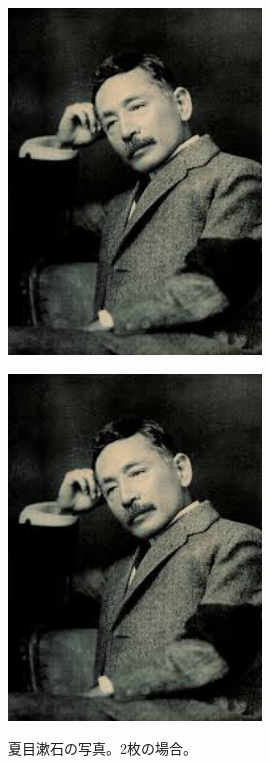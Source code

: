\documentclass[uplatex]{jsarticle}
\begin{document}
\begin{figure}[H]
	\centering
	\begin{minipage}[b]{0.49\linewidth}
		\centering
		\includegraphics[width=0.6\textwidth]{figure/natsume_soseki.jpeg}
		\label{fig:first}
	\end{minipage}
	\begin{minipage}[b]{0.49\linewidth}
		\centering
		\includegraphics[width=0.6\textwidth]{figure/natsume_soseki.jpeg}
		\label{fig:second}
	\end{minipage}
	\caption{夏目漱石の写真\cite{Soseki1905}。2枚の場合。}
	\label{fig:}
\end{figure}
\end{document}

